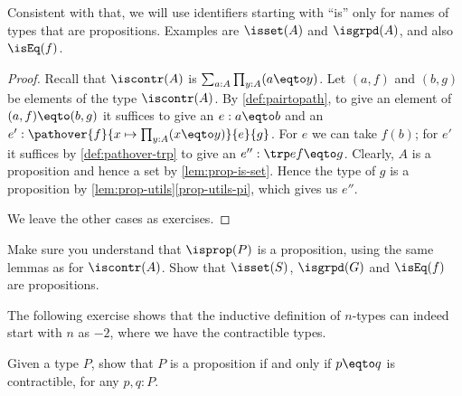 Consistent with that, we will use identifiers starting with ``is'' only for names of types
that are propositions. Examples are $\isset(A)$ and $\isgrpd(A)$,
and also $\isEq(f)$.

\begin{proof}
Recall that $\iscontr(A)$ is $\sum_{a:A} \prod_{y:A} (a \eqto y)$.
Let $(a,f)$ and $(b,g)$ be elements of the type $\iscontr(A)$.
By \cref{def:pairtopath}, to give an element of $(a,f) \eqto (b,g)$ it suffices
to give an $e : a \eqto b$ and an $e' : \pathover{f}{x\mapsto\prod_{y:A} (x \eqto y)}{e}{g}$.
For $e$ we can take $f(b)$; for $e'$ it suffices by \cref{def:pathover-trp}
to give an $e'' : \trp e f \eqto g$. Clearly, $A$ is a proposition and hence
a set by \cref{lem:prop-is-set}. Hence the type of $g$ is a proposition
by \cref{lem:prop-utils}\ref{prop-utils-pi}, which gives us $e''$.

We leave the other cases as exercises.
\end{proof}

\begin{xca}\label{xca:isX-is-prop}
Make sure you understand that $\isprop(P)$ is a proposition,
using the same lemmas as for $\iscontr(A)$.
Show that $\isset(S)$, $\isgrpd(G)$ and $\isEq(f)$ are propositions.
\end{xca}

The following exercise shows that the inductive definition of $n$-types can
indeed start with $n$ as $-2$, where we have the contractible types.

\begin{xca}\label{xca:prop-contractible=}
Given a type $P$, show that $P$ is a proposition if and only if $p \eqto q$ 
is contractible, for any $p, q: P$.
\end{xca}

